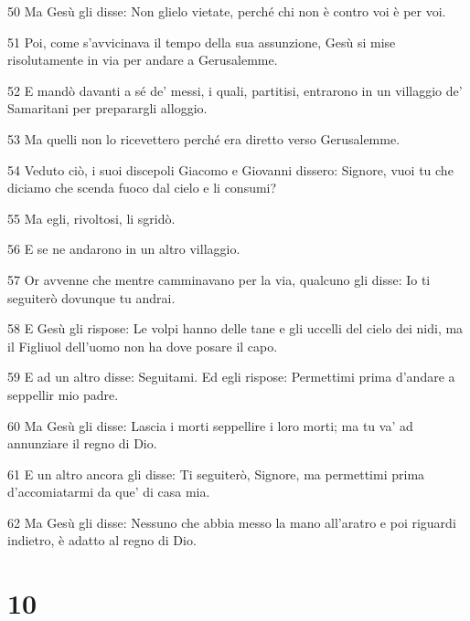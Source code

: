 \par 50 Ma Gesù gli disse: Non glielo vietate, perché chi non è contro voi è per voi.
\par 51 Poi, come s'avvicinava il tempo della sua assunzione, Gesù si mise risolutamente in via per andare a Gerusalemme.
\par 52 E mandò davanti a sé de' messi, i quali, partitisi, entrarono in un villaggio de' Samaritani per preparargli alloggio.
\par 53 Ma quelli non lo ricevettero perché era diretto verso Gerusalemme.
\par 54 Veduto ciò, i suoi discepoli Giacomo e Giovanni dissero: Signore, vuoi tu che diciamo che scenda fuoco dal cielo e li consumi?
\par 55 Ma egli, rivoltosi, li sgridò.
\par 56 E se ne andarono in un altro villaggio.
\par 57 Or avvenne che mentre camminavano per la via, qualcuno gli disse: Io ti seguiterò dovunque tu andrai.
\par 58 E Gesù gli rispose: Le volpi hanno delle tane e gli uccelli del cielo dei nidi, ma il Figliuol dell'uomo non ha dove posare il capo.
\par 59 E ad un altro disse: Seguitami. Ed egli rispose: Permettimi prima d'andare a seppellir mio padre.
\par 60 Ma Gesù gli disse: Lascia i morti seppellire i loro morti; ma tu va' ad annunziare il regno di Dio.
\par 61 E un altro ancora gli disse: Ti seguiterò, Signore, ma permettimi prima d'accomiatarmi da que' di casa mia.
\par 62 Ma Gesù gli disse: Nessuno che abbia messo la mano all'aratro e poi riguardi indietro, è adatto al regno di Dio.

\chapter{10}

